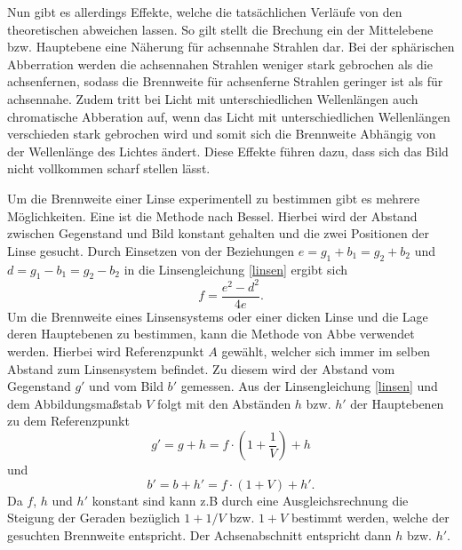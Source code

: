 Nun gibt es allerdings Effekte, welche die tatsächlichen Verläufe von den theoretischen abweichen lassen. So gilt stellt die Brechung ein der Mittelebene bzw. Hauptebene eine Näherung für achsennahe Strahlen dar. Bei der sphärischen Abberration werden die achsennahen Strahlen weniger stark gebrochen als die achsenfernen, sodass die Brennweite für achsenferne Strahlen geringer ist als für achsennahe. Zudem tritt bei Licht mit unterschiedlichen Wellenlängen auch chromatische Abberation auf, wenn das Licht mit unterschiedlichen Wellenlängen verschieden stark gebrochen wird und somit sich die Brennweite Abhängig von der Wellenlänge des Lichtes ändert. Diese Effekte führen dazu, dass sich das Bild nicht vollkommen scharf stellen lässt.

Um die Brennweite einer Linse experimentell zu bestimmen gibt es mehrere Möglichkeiten. Eine ist die Methode nach Bessel. Hierbei wird der Abstand zwischen Gegenstand und Bild konstant gehalten und die zwei Positionen der Linse gesucht. Durch Einsetzen von der Beziehungen $e=g_1+b_1=g_2+b_2$ und $d=g_1−b_1=g_2−b_2$ in die Linsengleichung \eqref{linsen} ergibt sich
\begin{equation}
	f=\frac{e^2-d^2}{4 e}. \label{unnoetig1}
\end{equation}
Um die Brennweite eines Linsensystems oder einer dicken Linse und die Lage deren Hauptebenen zu bestimmen, kann die Methode von Abbe verwendet werden. Hierbei wird Referenzpunkt $A$ gewählt, welcher sich immer im selben Abstand zum Linsensystem befindet. Zu diesem wird der Abstand vom Gegenstand $g'$ und vom Bild $b'$ gemessen. Aus der Linsengleichung \eqref{linsen} und dem Abbildungsmaßstab $V$ folgt mit den Abständen $h$ bzw. $h'$ der Hauptebenen zu dem Referenzpunkt
\begin{equation}
	g'=g+h=f \cdot \left(1+\frac{1}{V}\right)+h\label{unnoetig2}
\end{equation}
und
\begin{equation}
b'=b+h'=f \cdot \left(1+V\right)+h' .\label{unnoetig3}
\end{equation}
Da $f$, $h$ und $h'$ konstant sind kann z.B durch eine Ausgleichsrechnung die Steigung der Geraden bezüglich $1+1/V$ bzw. $1+V$ bestimmt werden, welche der gesuchten Brennweite entspricht. Der Achsenabschnitt entspricht dann $h$ bzw. $h'$.
